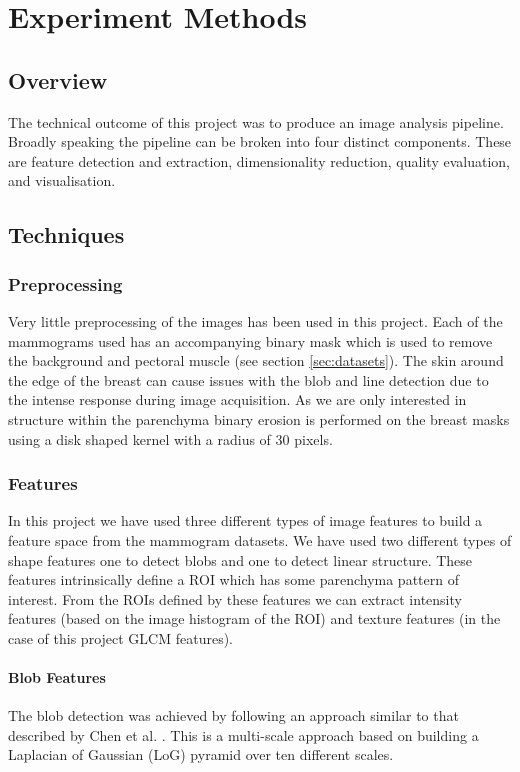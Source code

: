 \chapter{Experiment Methods}

\section{Overview}

The technical outcome of this project was to produce an image analysis pipeline. Broadly speaking the pipeline can be broken into four distinct components. These are feature detection and extraction, dimensionality reduction, quality evaluation, and visualisation.

\section{Techniques}

\subsection{Preprocessing}
Very little preprocessing of the images has been used in this project. Each of the mammograms used has an accompanying binary mask which is used to remove the background and pectoral muscle (see section \ref{sec:datasets}). The skin around the edge of the breast can cause issues with the blob and line detection due to the intense response during image acquisition. As we are only interested in structure within the parenchyma binary erosion is performed on the breast masks using a disk shaped kernel with a radius of 30 pixels.

\subsection{Features}
\label{sec:experiment-features}
In this project we have used three different types of image features to build a feature space from the mammogram datasets. We have used two different types of shape features one to detect blobs and one to detect linear structure. These features intrinsically define a ROI which has some parenchyma pattern of interest. From the ROIs defined by these features we can extract intensity features (based on the image histogram of the ROI) and texture features (in the case of this project GLCM features).

\subsubsection{Blob Features}
The blob detection was achieved by following an approach similar to that described by Chen et al. \cite{chen2013multiscale, chen2013mammographic}. This is a multi-scale approach based on building a Laplacian of Gaussian (LoG) pyramid over ten different scales. 

